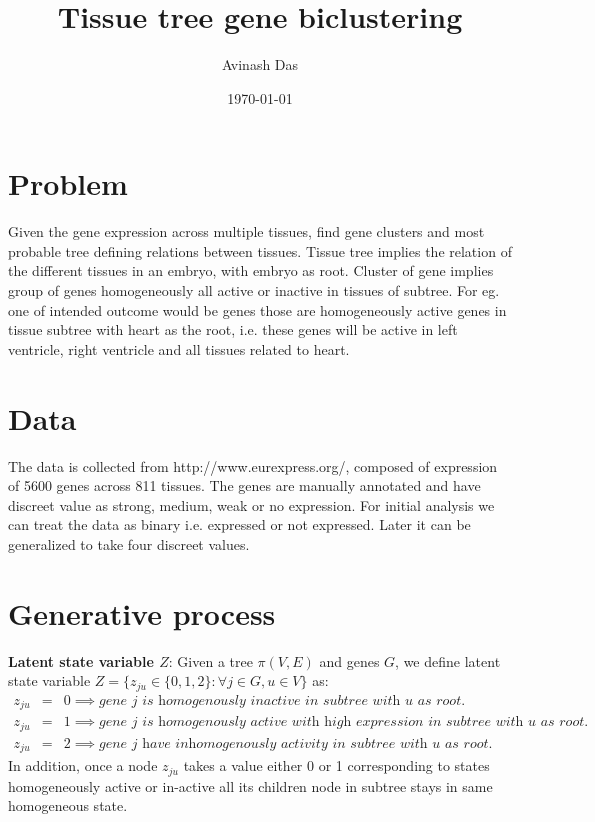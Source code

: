 \documentclass{article}
\title{
Tissue tree gene biclustering
}
\author{Avinash Das}
\date{\today}
\begin{document}
\pagestyle{fancy}

\maketitle

\section{Problem}
Given the gene expression across multiple tissues, find gene clusters and most probable tree defining relations between tissues.  
Tissue tree implies the relation of the different tissues in an embryo, with embryo as root. Cluster of gene implies  
group of genes homogeneously all active or inactive in tissues of subtree. For eg. one of intended outcome would be genes those
are homogeneously active genes in tissue subtree with heart as the root, i.e. these genes will be active in left ventricle, right ventricle
and all tissues related to heart.


\section{Data}
The data is collected from http://www.eurexpress.org/, composed of expression of 5600 genes across 811 tissues. The genes are manually annotated and have discreet value as strong, medium, weak or no expression. 
For initial analysis we can treat the data as binary i.e. expressed or not expressed. Later it can be generalized to take four discreet values. 

\section{Generative process}

\par \textbf{Latent state variable $Z$}:
Given a tree $\pi(V,E)$ and genes $G$, we define latent state variable $Z= \{z_{ju} \in\{0,1,2\} : \forall j \in G, u \in V\}$ as:
\begin{eqnarray}
	z_{ju} &=& 0 \implies \textit{gene $j$ is homogenously inactive in subtree with $u$ as root.} \nonumber\\ 
	z_{ju} &=& 1 \implies \textit{gene $j$ is homogenously active with high expression in subtree with  $u$ as root.} \nonumber \\
	z_{ju} &=& 2 \implies \textit{gene $j$ have inhomogenously activity in subtree with $u$ as root.} \nonumber 
\end{eqnarray}
In addition, once a node $z_{ju}$ takes a value either 0 or 1 corresponding to states homogeneously active or in-active all its children 
node in subtree stays in same homogeneous state. 
\end{document}

